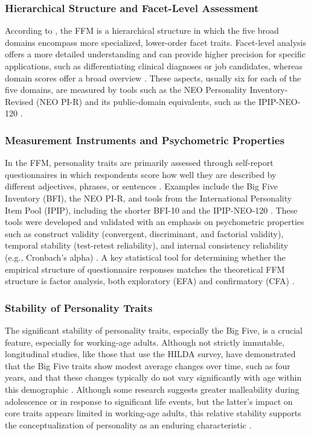 \documentclass{DESSThesis}
\begin{document}
\subsubsection{Hierarchical Structure and Facet-Level Assessment}
According to \cite{kajonius_assessing_2019,maples_test_2014}, the FFM is a hierarchical structure in which the five broad domains encompass more specialized, lower-order facet traits. Facet-level analysis offers a more detailed understanding and can provide higher precision for specific applications, such as differentiating clinical diagnoses or job candidates, whereas domain scores offer a broad overview \cite{kajonius_assessing_2019}. These aspects, usually six for each of the five domains, are measured by tools such as the NEO Personality Inventory-Revised (NEO PI-R) and its public-domain equivalents, such as the IPIP-NEO-120 \cite{johnson_measuring_2014,maples_test_2014}.

\subsubsection{Measurement Instruments and Psychometric Properties}
In the FFM, personality traits are primarily assessed through self-report questionnaires in which respondents score how well they are described by different adjectives, phrases, or sentences \cite{feng_five-factor_2024,johnson_measuring_2014}. Examples include the Big Five Inventory (BFI), the NEO PI-R, and tools from the International Personality Item Pool (IPIP), including the shorter BFI-10 and the IPIP-NEO-120 \cite{maples_test_2014,johnson_measuring_2014,rammstedt_big_2014}. These tools were developed and validated with an emphasis on psychometric properties such as construct validity (convergent, discriminant, and factorial validity), temporal stability (test-retest reliability), and internal consistency reliability (e.g., Cronbach's alpha) \cite{johnson_measuring_2014,rammstedt_big_2014,kajonius_assessing_2019}. A key statistical tool for determining whether the empirical structure of questionnaire responses matches the theoretical FFM structure is factor analysis, both exploratory (EFA) and confirmatory (CFA) \cite{kajonius_assessing_2019,kamarulzaman_confirmatory_2012}.

\subsubsection{Stability of Personality Traits}
The significant stability of personality traits, especially the Big Five, is a crucial feature, especially for working-age adults. Although not strictly immutable, longitudinal studies, like those that use the HILDA survey, have demonstrated that the Big Five traits show modest average changes over time, such as four years, and that these changes typically do not vary significantly with age within this demographic \cite{cobb-clark_stability_2012}. Although some research suggests greater malleability during adolescence or in response to significant life events, but the latter's impact on core traits appears limited in working-age adults, this relative stability supports the conceptualization of personality as an enduring characteristic \cite{cobb-clark_stability_2012}.
\end{document}
